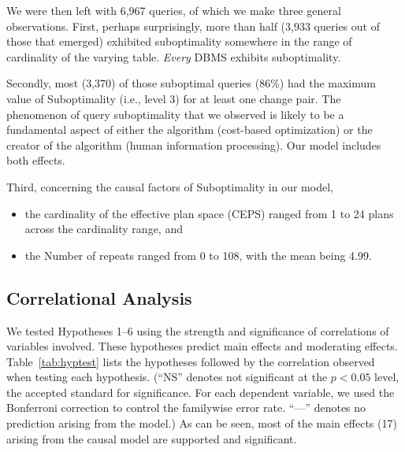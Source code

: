 \documentclass[prodmode,acmtods]{acmsmall}
\begin{document}
We were then left with 6,967 queries, of which we make three general
observations. 
First, perhaps surprisingly, 
more than half (3,933 queries out of those that emerged) exhibited suboptimality
somewhere in the range of cardinality of the varying table. 
{\em Every} \hbox{DBMS} exhibits suboptimality.

Secondly, most (3,370) of those suboptimal queries (86\%) had the maximum value of
Suboptimality  (i.e., level 3) for at least one change pair.
The phenomenon of query suboptimality that we observed is likely to be a
fundamental aspect of either the 
\hbox{algorithm} (cost-based optimization) or the
creator of the algorithm (human information processing). Our model includes
both effects.

Third, concerning the causal factors of Suboptimality in our model,
\begin{itemize}
\item the cardinality of the effective plan space (CEPS) ranged from 1 to 24
plans across the cardinality range,
 and
\item the Number of repeats ranged from 0 to 108, with the mean being 4.99.
\end{itemize}
 
\subsection{Correlational Analysis}\label{sec:corr}
We tested Hypotheses 1--6 using the strength and significance of
correlations of variables involved. These hypotheses predict
 main effects
and  moderating effects. Table~\ref{tab:hyptest} lists the hypotheses
followed by the correlation observed when testing each hypothesis.  (``NS''
denotes not significant at the $p < 0.05$ level, the accepted standard for
significance. For each dependent variable, we used the Bonferroni correction
to control the familywise error rate. ``---'' denotes no prediction arising
from the model.)  As can be seen, most of the main effects (17) arising from
the causal model are supported and significant.  
\end{document}
